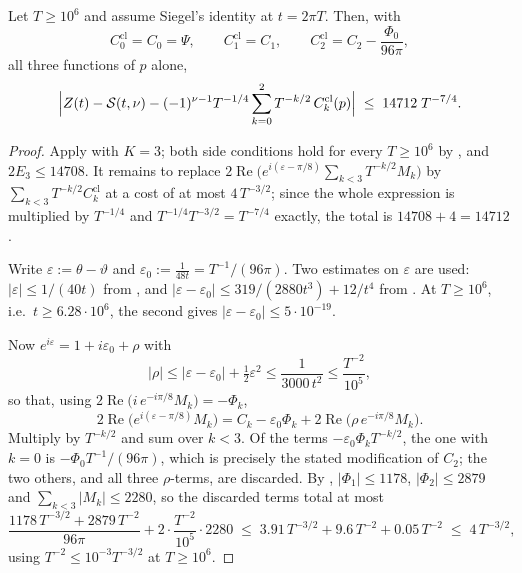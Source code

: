 \begin{corollary}
\label{cor:rsg_classical}
Let $T\ge10^{6}$ and assume Siegel's identity at $t=2\pi T$.  Then, with
\[
  C^{\mathrm{cl}}_{0}=C_{0}=\Psi,\qquad C^{\mathrm{cl}}_{1}=C_{1},\qquad
  C^{\mathrm{cl}}_{2}=C_{2}-\frac{\Phi_{0}}{96\pi},
\]
all three functions of $p$ alone,
\[
  \Bigl\lvert Z(t)-\mathcal{S}(t,\nu)-(-1)^{\nu-1}T^{-1/4}
    \sum_{k=0}^{2}T^{-k/2}\,C^{\mathrm{cl}}_{k}(p)\Bigr\rvert
  \;\le\;14712\;T^{-7/4}.
\]
\end{corollary}

\begin{proof}
Apply  with $K=3$; both side conditions hold for every $T\ge10^{6}$ by
, and $2E_{3}\le14708$.  It remains to replace
$2\operatorname{Re}\bigl(e^{i(\varepsilon-\pi/8)}\sum_{k<3}T^{-k/2}M_{k}\bigr)$ by
$\sum_{k<3}T^{-k/2}C^{\mathrm{cl}}_{k}$ at a cost of at most $4\,T^{-3/2}$; since the whole
expression is multiplied by $T^{-1/4}$ and $T^{-1/4}T^{-3/2}=T^{-7/4}$ exactly, the total is
$14708+4=14712$.

Write $\varepsilon:=\theta-\vartheta$ and $\varepsilon_{0}:=\tfrac1{48t}=T^{-1}/(96\pi)$.  Two
estimates on $\varepsilon$ are used: $\lvert\varepsilon\rvert\le1/(40t)$ from
, and $\lvert\varepsilon-\varepsilon_{0}\rvert\le319/(2880t^{3})+12/t^{4}$
from .  At $T\ge10^{6}$, i.e.\ $t\ge6.28\cdot10^{6}$, the second gives
$\lvert\varepsilon-\varepsilon_{0}\rvert\le5\cdot10^{-19}$.

Now $e^{i\varepsilon}=1+i\varepsilon_{0}+\rho$ with
\[
  \lvert\rho\rvert\le\lvert\varepsilon-\varepsilon_{0}\rvert+\tfrac12\varepsilon^{2}
  \le\frac1{3000\,t^{2}}\le\frac{T^{-2}}{10^{5}},
\]
so that, using $2\operatorname{Re}\bigl(i\,e^{-i\pi/8}M_{k}\bigr)=-\Phi_{k}$,
\[
  2\operatorname{Re}\bigl(e^{i(\varepsilon-\pi/8)}M_{k}\bigr)
   =C_{k}-\varepsilon_{0}\Phi_{k}+2\operatorname{Re}\bigl(\rho\,e^{-i\pi/8}M_{k}\bigr).
\]
Multiply by $T^{-k/2}$ and sum over $k<3$.  Of the terms $-\varepsilon_{0}\Phi_{k}T^{-k/2}$, the
one with $k=0$ is $-\Phi_{0}T^{-1}/(96\pi)$, which is precisely the stated modification of
$C_{2}$; the two others, and all three $\rho$-terms, are discarded.  By
, $\lvert\Phi_{1}\rvert\le1178$, $\lvert\Phi_{2}\rvert\le2879$ and
$\sum_{k<3}\lvert M_{k}\rvert\le2280$, so the discarded terms total at most
\[
  \frac{1178\,T^{-3/2}+2879\,T^{-2}}{96\pi}+2\cdot\frac{T^{-2}}{10^{5}}\cdot2280
  \;\le\;3.91\,T^{-3/2}+9.6\,T^{-2}+0.05\,T^{-2}\;\le\;4\,T^{-3/2},
\]
using $T^{-2}\le10^{-3}T^{-3/2}$ at $T\ge10^{6}$.
\end{proof}

